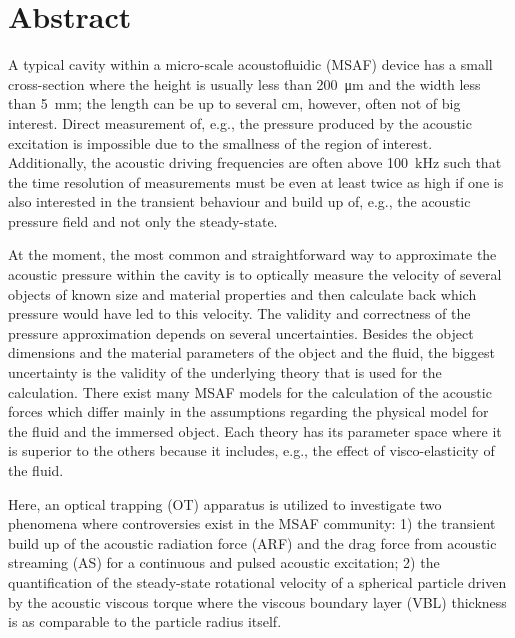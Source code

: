 \chapter*{Abstract} 

A typical cavity within a micro-scale acoustofluidic (MSAF) device has a small 
cross-section where the height is usually less than \SI{200}{\um} and the width 
less than \SI{5}{\mm}; the length can be up to several \si{\cm}, however, often 
not of big interest. Direct measurement of, e.g., the pressure produced by the 
acoustic excitation is impossible due to the smallness of the region of 
interest. Additionally, the acoustic driving frequencies are often above 
\SI{100}{\kilo\hertz} such that the time resolution of measurements must be 
even at least twice as high if one is also interested in the transient 
behaviour and build up of, e.g., the acoustic pressure field and not only the 
steady-state.

At the moment, the most common and straightforward way to approximate the 
acoustic pressure within the cavity is to optically measure the velocity of 
several objects of known size and material properties and then calculate back 
which pressure would have led to this velocity. The validity and correctness 
of the pressure approximation depends on several uncertainties. Besides the 
object dimensions and the material parameters of the object and the fluid, the 
biggest uncertainty is the validity of the underlying theory that is used for 
the calculation. There exist many MSAF models for the calculation of the 
acoustic forces which differ mainly in the assumptions regarding the physical 
model for the fluid and the immersed object. Each theory has its parameter 
space where it is superior to the others because it includes, e.g., the effect 
of visco-elasticity of the fluid.

Here, an optical trapping (OT) apparatus is utilized to investigate two 
phenomena where controversies exist in the MSAF community: 1) the transient 
build up of the acoustic radiation force (ARF) and the drag force from acoustic 
streaming (AS) for a continuous and pulsed acoustic excitation; 2) the 
quantification of the steady-state rotational velocity of a spherical particle 
driven by the acoustic viscous torque where the viscous boundary layer (VBL) 
thickness is as comparable to the particle radius itself.

